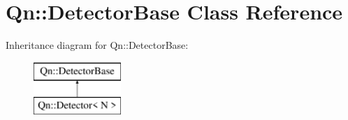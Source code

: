 \hypertarget{classQn_1_1DetectorBase}{}\section{Qn\+:\+:Detector\+Base Class Reference}
\label{classQn_1_1DetectorBase}
Inheritance diagram for Qn\+:\+:Detector\+Base\+:\begin{figure}[H]
\begin{center}
\leavevmode
\includegraphics[height=2.000000cm]{classQn_1_1DetectorBase}
\end{center}
\end{figure}

